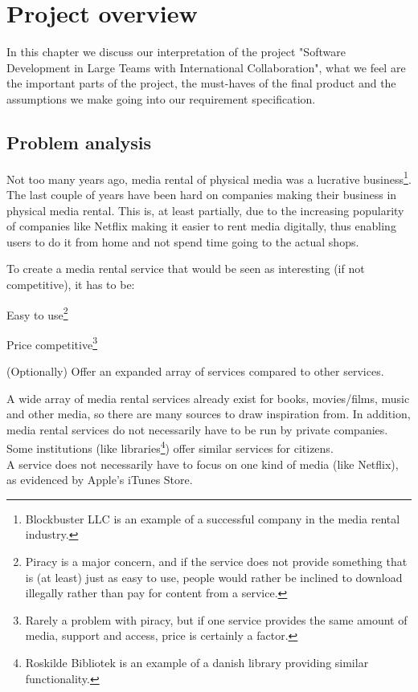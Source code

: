 \chapter{Project overview}
\label{Overview}
In this chapter we discuss our interpretation of the project "Software Development in Large Teams with International Collaboration", what we feel are the important parts of the project, the must-haves of the final product and the assumptions we make going into our requirement specification.
\section{Problem analysis}
\label{Overview_analysis}
Not too many years ago, media rental of physical media was a lucrative business\footnote{Blockbuster LLC\cite{Block-wiki} is an example of a successful company in the media rental industry.}. The last couple of years have been hard on companies making their business in physical media rental\cite{Block-loss}. This is, at least partially, due to the increasing popularity of companies like Netflix\cite{Netflix-wiki} making it easier to rent media digitally, thus enabling users to do it from home and not spend time going to the actual shops.

To create a media rental service that would be seen as interesting (if not competitive), it has to be:
\begin{my_itemize}
\item Easy to use\footnote{Piracy is a major concern, and if the service does not provide something that is (at least) just as easy to use, people would rather be inclined to download illegally rather than pay for content from a service\cite{GN-interview}.}
\item Price competitive\footnote{Rarely a problem with piracy, but if one service provides the same amount of media, support and access, price is certainly a factor.}
\item (Optionally) Offer an expanded array of services compared to other services.
\end{my_itemize}

A wide array of media rental services already exist for books, movies/films, music and other media, so there are many sources to draw inspiration from. In addition, media rental services do not necessarily have to be run by private companies. Some institutions (like libraries\footnote{Roskilde Bibliotek is an example of a danish library providing similar functionality\cite{rosbib}.}) offer similar services for citizens.\\
A service does not necessarily have to focus on one kind of media (like Netflix), as evidenced by Apple's iTunes Store\cite{ITstore}. 

